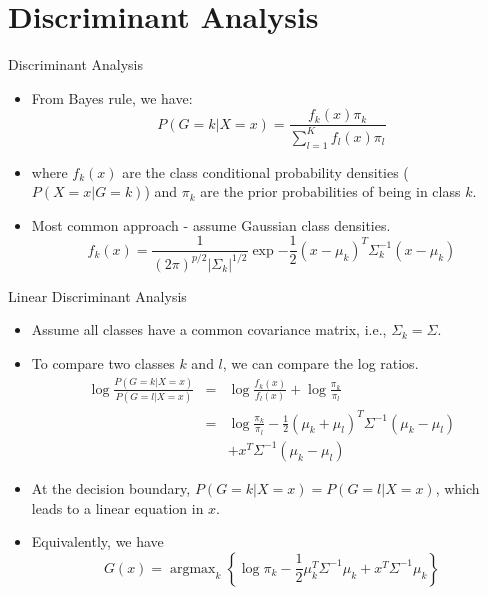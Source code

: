 \documentclass[aspectratio=169]{beamer}
\DeclareMathOperator*{\argmax}{argmax}
\begin{document}
\section{Discriminant Analysis}

\begin{frame}{Discriminant Analysis}
    \begin{itemize}
        \item From Bayes rule, we have:
        \begin{equation*}
            P(G = k|X = x) = \frac{f_k(x)\pi_k}{\sum_{l=1}^K f_l(x)\pi_l}
        \end{equation*}
        \item where $f_k(x)$ are the class conditional probability densities ($P(X = x | G=k)$) and $\pi_k$ are the prior probabilities of being in class $k$.
        \item Most common approach - assume Gaussian class densities.
        \begin{equation*}
            f_k(x) = \frac{1}{(2\pi)^{p/2}|\Sigma_k|^{1/2}}\exp{-\frac{1}{2}(x-\mu_k)^T\Sigma_k^{-1}(x-\mu_k)}
        \end{equation*}
    \end{itemize}
\end{frame} 


\begin{frame}{Linear Discriminant Analysis}
    \begin{itemize}
        \item Assume all classes have a common covariance matrix, i.e., $\Sigma_k = \Sigma$.
        \item To compare two classes $k$ and $l$, we can compare the log ratios.
        \begin{eqnarray*}
            \log{\frac{P(G = k|X = x)}{P(G = l|X = x)}} & = & \log{\frac{f_k(x)}{f_l(x)}} + \log{\frac{\pi_k}{\pi_l}}\\
            & = & \log{\frac{\pi_k}{\pi_l}} -\frac{1}{2}(\mu_k+\mu_l)^T\Sigma^{-1}(\mu_k-\mu_l) \\
            & & + x^T \Sigma^{-1} (\mu_k - \mu_l)
        \end{eqnarray*}
        \item At the decision boundary, $P(G=k|X=x) = P(G=l|X=x)$, which leads to a linear equation in $x$.
        \item Equivalently, we have
        \begin{equation*}
            G(x) = \argmax_k \left \{ \log{\pi_k} -\frac{1}{2}\mu_k^T\Sigma^{-1}\mu_k + x^T \Sigma^{-1} \mu_k \right \}
        \end{equation*}
    \end{itemize}
\end{frame}
\end{document}
